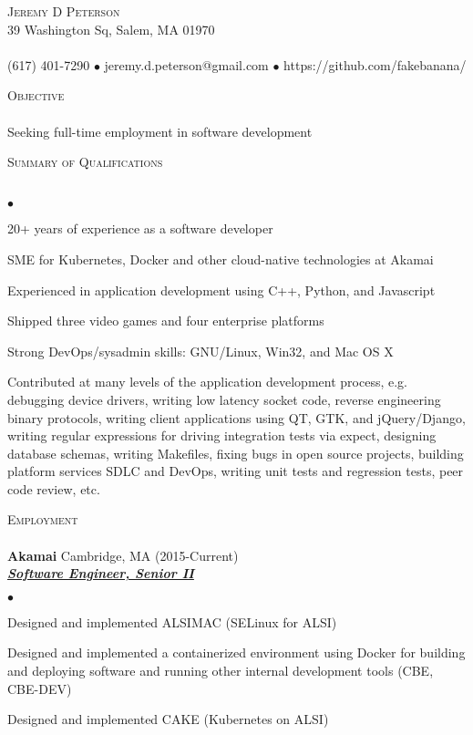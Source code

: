 \documentclass{article}
\newcommand{\lineunder}{\vspace*{-8pt} \\ \hspace*{-18pt} \hrulefill \\}
\newcommand{\header}[1]{{\hspace*{-15pt}\vspace*{6pt} \textsc{#1}} \vspace*{-6pt} \lineunder}
\newcommand{\employer}[4]{{ \textbf{#1} #2 (#3)\\ \underline{\textbf{\emph{#4}}}\\  }}
\newcommand{\contact}[3]{
\vspace*{-8pt}
\begin{center}
{\LARGE \scshape {#1}}\\
#2 \lineunder 
#3
\end{center}
\vspace*{-8pt}
}
\newcommand{\objective}[1]{{ #1\vspace*{8pt} }}
\newenvironment{achievements}{\begin{list}{$\bullet$}{\topsep 0pt \itemsep -2pt}}{\vspace*{4pt}\end{list}}
\begin{document}
\small
\smallskip
\vspace*{-44pt}

\contact{Jeremy D Peterson}
{39 Washington Sq, Salem, MA 01970}
{(617) 401-7290 $\bullet$ jeremy.d.peterson@gmail.com  $\bullet$ https://github.com/fakebanana/ }

\header{Objective}
\objective {Seeking full-time employment in software development}

\header{Summary of Qualifications}
\begin{achievements}
\item 20+ years of experience as a software developer
\item SME for Kubernetes, Docker and other cloud-native technologies at Akamai
\item Experienced in application development using C++, Python, and Javascript
\item Shipped three video games and four enterprise platforms
\item Strong DevOps/sysadmin skills: GNU/Linux, Win32, and Mac OS X
\item Contributed at many levels of the application development process, e.g. debugging device drivers, writing low latency socket code, reverse engineering binary protocols, writing client applications using QT, GTK, and jQuery/Django, writing regular expressions for driving integration tests via expect, designing database schemas, writing Makefiles, fixing bugs in open source projects, building platform services SDLC and DevOps, writing unit tests and regression tests, peer code review, etc.
\end{achievements}

\header{Employment}

	\employer{Akamai} {Cambridge, MA} {2015-Current} {Software Engineer, Senior II}
	\begin{achievements}
	\item Designed and implemented ALSIMAC (SELinux for ALSI)
	\item Designed and implemented a containerized environment using Docker for building and deploying software and running other internal development tools (CBE, CBE-DEV)
	\item Designed and implemented CAKE (Kubernetes on ALSI)
	\end{achievements}
\end{document}
